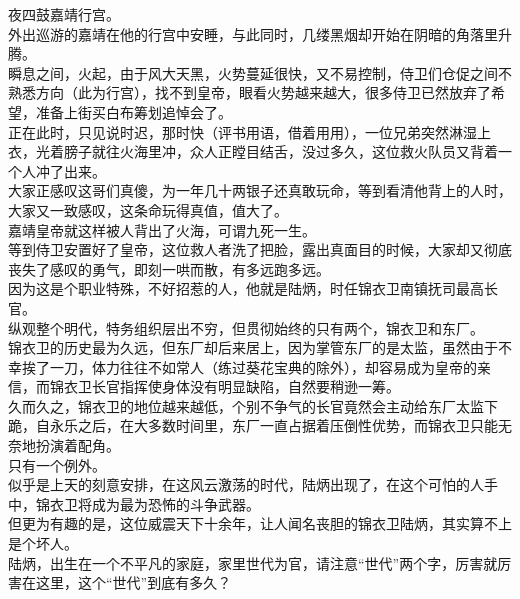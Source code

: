 \begin{multicols}{\theparacolNo}
夜四鼓嘉靖行宫。\\

外出巡游的嘉靖在他的行宫中安睡，与此同时，几缕黑烟却开始在阴暗的角落里升腾。\\

瞬息之间，火起，由于风大天黑，火势蔓延很快，又不易控制，侍卫们仓促之间不熟悉方向（此为行宫），找不到皇帝，眼看火势越来越大，很多侍卫已然放弃了希望，准备上街买白布筹划追悼会了。\\

正在此时，只见说时迟，那时快（评书用语，借着用用），一位兄弟突然淋湿上衣，光着膀子就往火海里冲，众人正瞠目结舌，没过多久，这位救火队员又背着一个人冲了出来。\\

大家正感叹这哥们真傻，为一年几十两银子还真敢玩命，等到看清他背上的人时，大家又一致感叹，这条命玩得真值，值大了。\\

嘉靖皇帝就这样被人背出了火海，可谓九死一生。\\

等到侍卫安置好了皇帝，这位救人者洗了把脸，露出真面目的时候，大家却又彻底丧失了感叹的勇气，即刻一哄而散，有多远跑多远。\\

因为这是个职业特殊，不好招惹的人，他就是陆炳，时任锦衣卫南镇抚司最高长官。\\

纵观整个明代，特务组织层出不穷，但贯彻始终的只有两个，锦衣卫和东厂。\\

锦衣卫的历史最为久远，但东厂却后来居上，因为掌管东厂的是太监，虽然由于不幸挨了一刀，体力往往不如常人（练过葵花宝典的除外），却容易成为皇帝的亲信，而锦衣卫长官指挥使身体没有明显缺陷，自然要稍逊一筹。\\

久而久之，锦衣卫的地位越来越低，个别不争气的长官竟然会主动给东厂太监下跪，自永乐之后，在大多数时间里，东厂一直占据着压倒性优势，而锦衣卫只能无奈地扮演着配角。\\

只有一个例外。\\

似乎是上天的刻意安排，在这风云激荡的时代，陆炳出现了，在这个可怕的人手中，锦衣卫将成为最为恐怖的斗争武器。\\

但更为有趣的是，这位威震天下十余年，让人闻名丧胆的锦衣卫陆炳，其实算不上是个坏人。\\

陆炳，出生在一个不平凡的家庭，家里世代为官，请注意“世代”两个字，厉害就厉害在这里，这个“世代”到底有多久？\\


\end{multicols}
